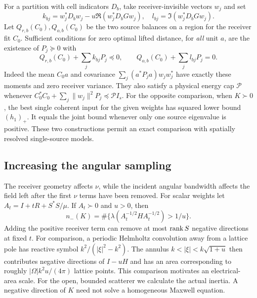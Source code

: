 \documentclass[anonymous,12pt]{iopjournal}
\numberwithin{equation}{section}
\begin{document}
For a partition with cell indicators $D_b$, take receiver-invisible vectors $w_j$ and set
\[
 k_{bj}=w_j^*D_bw_j-u\Re(w_j^*D_bGw_j),\quad
 l_{bj}=\Im(w_j^*D_bGw_j).
\]
Let $Q_{r,b}(C_0),Q_{o,b}(C_0)$ be the two source balances on a region for the receiver fit $C_0$. Sufficient conditions for zero optimal lifted distance, for \emph{all} unit $a$, are the existence of $P_j\succeq0$ with
\begin{equation}
 Q_{r,b}(C_0)+\sum_j k_{bj}P_j\preceq0,\qquad
 Q_{o,b}(C_0)+\sum_j l_{bj}P_j=0 .\label{eq:regionalmoment}
\end{equation}
Indeed the mean $C_0a$ and covariance $\sum_j(a^*P_j a)w_jw_j^*$ have exactly these moments and zero receiver variance. They also satisfy a physical energy cap $\mathcal P$ whenever
$C_0^*C_0+\sum_j\|w_j\|^2P_j\preceq\mathcal P I_s$.
For the opposite comparison, when $K\succ0$, the best single coherent input for the given weights has squared lower bound $(h_1)_+$. It equals the joint bound whenever only one source eigenvalue is positive. These two constructions permit an exact comparison with spatially resolved single-source models.

\subsection{Increasing the angular sampling}
The receiver geometry affects $\nu$, while the incident angular bandwidth affects the field left after the first $\nu$ terms have been removed. For scalar weights let $A_t=I+tR+S^*S/\mu$. If $A_t\succ0$ and $u>0$, then
\[
 n_-(K)=\#\{\lambda(A_t^{-1/2}H A_t^{-1/2})>1/u\}.
\]
Adding the positive receiver term can remove at most $\operatorname{rank} S$ negative directions at fixed $t$. For comparison, a periodic Helmholtz convolution away from a lattice pole has reactive symbol $k^2/(|\xi|^2-k^2)$. The annulus $k<|\xi|<k\sqrt{1+u}$ then contributes negative directions of $I-uH$ and has an area corresponding to roughly $|\Omega|k^2u/(4\pi)$ lattice points. This comparison motivates an electrical-area scale. For the open, bounded scatterer we calculate the actual inertia. A negative direction of $K$ need not solve a homogeneous Maxwell equation.
\end{document}
